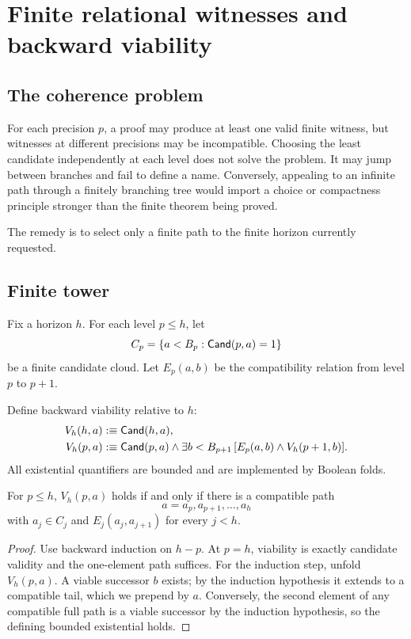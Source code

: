 \section{Finite relational witnesses and backward viability}
\label{sec:relational}

\subsection{The coherence problem}

For each precision \(p\), a proof may produce at least one valid finite witness,
but witnesses at different precisions may be incompatible.  Choosing the least
candidate independently at each level does not solve the problem.  It may jump
between branches and fail to define a name.  Conversely, appealing to an
infinite path through a finitely branching tree would import a choice or
compactness principle stronger than the finite theorem being proved.

The remedy is to select only a finite path to the finite horizon currently
requested.

\subsection{Finite tower}

Fix a horizon \(h\).  For each level \(p\le h\), let
\[
 C_p=\{a<B_p:\mathsf{Cand}(p,a)=1\}
\]
be a finite candidate cloud.  Let \(E_p(a,b)\) be the compatibility relation
from level \(p\) to \(p+1\).

Define backward viability relative to \(h\):
\begin{align*}
 V_h(h,a)&:\equiv \mathsf{Cand}(h,a),\\
 V_h(p,a)&:\equiv \mathsf{Cand}(p,a)\wedge
   \exists b<B_{p+1}\,[E_p(a,b)\wedge V_h(p+1,b)].
\end{align*}
All existential quantifiers are bounded and are implemented by Boolean folds.

\begin{theorem}
\label{thm:viability}
For \(p\le h\), \(V_h(p,a)\) holds if and only if there is a compatible path
\[
 a=a_p,a_{p+1},\ldots,a_h
\]
with \(a_j\in C_j\) and \(E_j(a_j,a_{j+1})\) for every \(j<h\).
\end{theorem}

\begin{proof}
Use backward induction on \(h-p\).  At \(p=h\), viability is exactly candidate
validity and the one-element path suffices.  For the induction step, unfold
\(V_h(p,a)\).  A viable successor \(b\) exists; by the induction hypothesis it
extends to a compatible tail, which we prepend by \(a\).  Conversely, the
second element of any compatible full path is a viable successor by the
induction hypothesis, so the defining bounded existential holds.
\end{proof}

